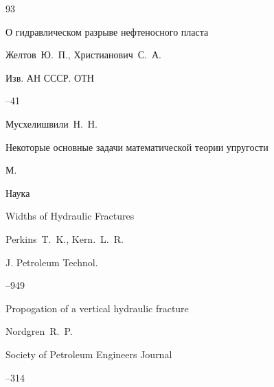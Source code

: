 \begin{thebibliography}{93}






\paper О гидравлическом разрыве нефтеносного пласта

\by   Желтов~Ю.~П., Христианович~С.~А.

\jour Изв. АН СССР. ОТН



--41




\by Мусхелишвили~Н.~Н.

\book Некоторые основные задачи математической теории упругости

\publaddr М.

\publ Наука






\paper Widths of Hydraulic Fractures

\by   Perkins~T.~K., Kern.~L.~R.

\jour J. Petroleum Technol.




--949




 






\paper Propogation of a vertical hydraulic fracture

\by   Nordgren~R.~P.

\jour Society of Petroleum Engineers Journal 




--314









\end{thebibliography}
